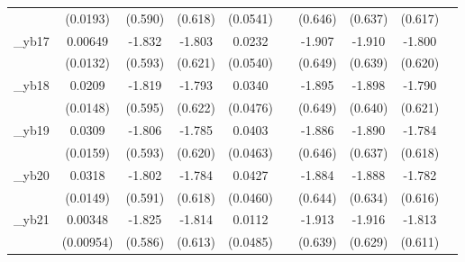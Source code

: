 \begin{table}[htbp]
\begin{tabular}{l*{9}{c}}
            &    (0.0193)         &     (0.590)         &     (0.618)         &    (0.0541)         &                     &     (0.646)         &     (0.637)         &     (0.617)         &                     \\
[1em]
\_yb17       &     0.00649         &      -1.832\sym{***}&      -1.803\sym{***}&      0.0232         &                     &      -1.907\sym{***}&      -1.910\sym{***}&      -1.800\sym{***}&                     \\
            &    (0.0132)         &     (0.593)         &     (0.621)         &    (0.0540)         &                     &     (0.649)         &     (0.639)         &     (0.620)         &                     \\
[1em]
\_yb18       &      0.0209         &      -1.819\sym{***}&      -1.793\sym{***}&      0.0340         &                     &      -1.895\sym{***}&      -1.898\sym{***}&      -1.790\sym{***}&                     \\
            &    (0.0148)         &     (0.595)         &     (0.622)         &    (0.0476)         &                     &     (0.649)         &     (0.640)         &     (0.621)         &                     \\
[1em]
\_yb19       &      0.0309\sym{*}  &      -1.806\sym{***}&      -1.785\sym{***}&      0.0403         &                     &      -1.886\sym{***}&      -1.890\sym{***}&      -1.784\sym{***}&                     \\
            &    (0.0159)         &     (0.593)         &     (0.620)         &    (0.0463)         &                     &     (0.646)         &     (0.637)         &     (0.618)         &                     \\
[1em]
\_yb20       &      0.0318\sym{**} &      -1.802\sym{***}&      -1.784\sym{***}&      0.0427         &                     &      -1.884\sym{***}&      -1.888\sym{***}&      -1.782\sym{***}&                     \\
            &    (0.0149)         &     (0.591)         &     (0.618)         &    (0.0460)         &                     &     (0.644)         &     (0.634)         &     (0.616)         &                     \\
[1em]
\_yb21       &     0.00348         &      -1.825\sym{***}&      -1.814\sym{***}&      0.0112         &                     &      -1.913\sym{***}&      -1.916\sym{***}&      -1.813\sym{***}&                     \\
            &   (0.00954)         &     (0.586)         &     (0.613)         &    (0.0485)         &                     &     (0.639)         &     (0.629)         &     (0.611)         &                     \\

\end{tabular}
\end{table}
